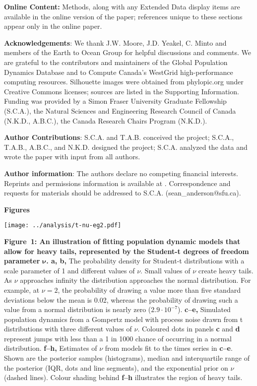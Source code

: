 

\textbf{Online Content:} Methods, along with any Extended Data display items are available in the online version of the paper; references unique to these sections appear only in the online paper.

\textbf{Acknowledgements}: We thank J.W. Moore, J.D. Yeakel, C. Minto and members of the Earth to Ocean Group for helpful discussions and comments. We are grateful to the contributors and maintainers of the Global Population Dynamics Database and to Compute Canada's WestGrid high-performance computing resources. Silhouette images were obtained from phylopic.org under Creative Commons licenses; sources are listed in the Supporting Information. Funding was provided by a Simon Fraser University Graduate Fellowship (S.C.A.), the Natural Sciences and Engineering Research Council of Canada (N.K.D., A.B.C.), the Canada Research Chairs Program (N.K.D.).

\textbf{Author Contributions}: S.C.A. and T.A.B. conceived the project; S.C.A., T.A.B., A.B.C., and N.K.D. designed the project; S.C.A. analyzed the data and wrote the paper with input from all authors.

\textbf{Author information}: The authors declare no competing financial interests. Reprints and permissions information is available at . Correspondence and requests for materials should be addressed to S.C.A. (sean\_anderson@sfu.ca).

\clearpage

\textbf{Figures}

\begin{center}
\texttt{[image: ../analysis/t-nu-eg2.pdf]}
\end{center}

\textbf{Figure~1: An illustration of fitting population dynamic models that allow for heavy tails, represented by the Student-t degrees of freedom parameter} \(\mathbf{\nu}\)\textbf{. a, b,} The probability density for Student-t distributions with a scale parameter of 1 and different values of \(\nu\). Small values of \(\nu\) create heavy tails. As \(\nu\) approaches infinity the distribution approaches the normal distribution. For example, at \(\nu = 2\), the probability of drawing a value more than five standard deviations below the mean is 0.02, whereas the probability of drawing such a value from a normal distribution is nearly zero (\(2.9 \cdot 10^{- 7}\)). \textbf{c--e,} Simulated population dynamics from a Gompertz model with process noise drawn from t distributions with three different values of \(\nu\). Coloured dots in panels \textbf{c} and \textbf{d} represent jumps with less than a 1 in 1000 chance of occurring in a normal distribution. \textbf{f--h,} Estimates of \(\nu\) from models fit to the times series in \textbf{c--e}. Shown are the posterior samples (histograms), median and interquartile range of the posterior (IQR, dots and line segments), and the exponential prior on \(\nu\) (dashed lines). Colour shading behind \textbf{f--h} illustrates the region of heavy tails.

